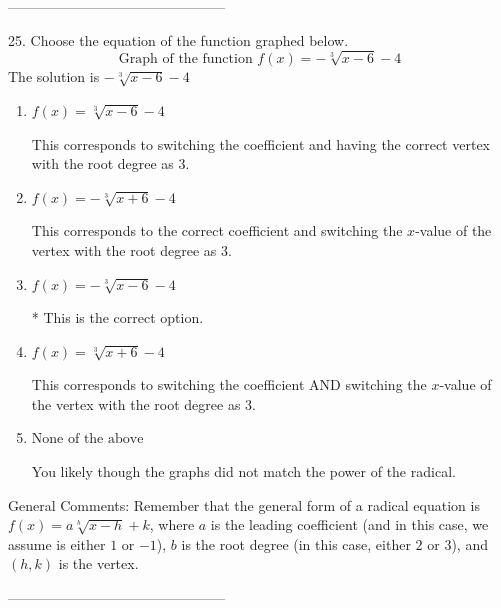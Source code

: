 \documentclass{extbook}[14pt]
\begin{document}
-----------------------------------------------

25. Choose the equation of the function graphed below.
\[ \text{Graph of the function } f(x) = - \sqrt[3]{x - 6} - 4 \] 
The solution is $ - \sqrt[3]{x - 6} - 4 $ 

\begin{enumerate}[label=\Alph*.] 
\item $ f(x) = \sqrt[3]{x - 6} - 4 $ 

 This corresponds to switching the coefficient and having the correct vertex with the root degree as $3$. 
\item $ f(x) = - \sqrt[3]{x + 6} - 4 $ 

 This corresponds to the correct coefficient and switching the $x$-value of the vertex with the root degree as $3$. 
\item $ f(x) = - \sqrt[3]{x - 6} - 4 $ 

 * This is the correct option. 
\item $ f(x) = \sqrt[3]{x + 6} - 4 $ 

 This corresponds to switching the coefficient AND switching the $x$-value of the vertex with the root degree as $3$. 
\item $ \text{None of the above} $ 

 You likely though the graphs did not match the power of the radical. 
\end{enumerate} 
 
General Comments: Remember that the general form of a radical equation is $ f(x) = a \sqrt[b]{x - h} + k$, where $a$ is the leading coefficient (and in this case, we assume is either $1$ or $-1$), $b$ is the root degree (in this case, either $2$ or $3$), and $(h, k)$ is the vertex.

-----------------------------------------------
\end{document}
